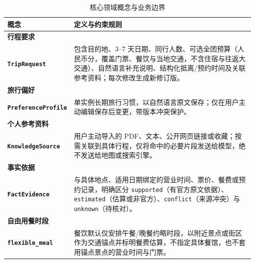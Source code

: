 \begin{table}[H]
  \centering
  \caption{核心领域概念与业务边界}
  \renewcommand{\arraystretch}{1.28}
  \begin{tabularx}{\textwidth}{@{} >{\raggedright\arraybackslash\sffamily\bfseries}p{3.7cm} Y @{}}
    \toprule
    概念 & 定义与约束规则 \\
    \midrule
    行程要求\\{\footnotesize\texttt{TripRequest}} & 包含目的地、3--7 天日期、同行人数、可选全团预算（人民币分，覆盖门票、餐饮与当地交通，不含住宿与往返大交通）、自然语言补充说明、结构化抵离/预约时间及关联参考资料；每次修改生成新修订版。 \\
    旅行偏好\\{\footnotesize\texttt{PreferenceProfile}} & 单实例长期旅行习惯，以自然语言原文保存；仅在用户主动编辑保存后变更，带版本冲突保护。 \\
    个人参考资料\\{\footnotesize\texttt{KnowledgeSource}} & 用户主动导入的 PDF、文本、公开网页链接或收藏；按需关联到具体行程，仅将命中的必要片段发送给模型，绝不发送给地图或搜索引擎。 \\
    事实依据\\{\footnotesize\texttt{FactEvidence}} & 与具体地点、适用日期绑定的营业时间、票价、餐费或预约记录，明确区分 \texttt{supported}（有官方原文依据）、\texttt{estimated}（估算或非官方）、\texttt{conflict}（来源冲突）与 \texttt{unknown}（待核对）。 \\
    自由用餐时段\\{\footnotesize\texttt{flexible\_meal}} & 餐饮默认仅安排午餐/晚餐约略时段，以附近景点或街区作为交通锚点并标明餐费估算，不指定具体餐馆，也不套用锚点景点的营业时间与门票。 \\
    \bottomrule
  \end{tabularx}
\end{table}
